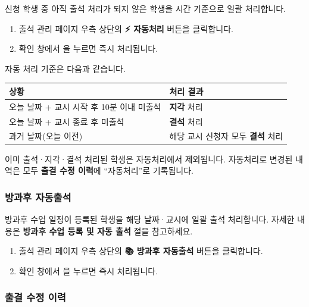 \documentclass[a4paper,12pt]{article}
\newcommand{\menu}[1]{\textcolor{primary}{\textbf{#1}}}
\newcommand{\key}[1]{\fbox{\small\texttt{#1}}}
\begin{document}
신청 학생 중 아직 출석 처리가 되지 않은 학생을 시간 기준으로 일괄 처리합니다.

\begin{enumerate}[leftmargin=1.5em]
    \item 출석 관리 페이지 우측 상단의 \menu{⚡ 자동처리} 버튼을 클릭합니다.
    \item 확인 창에서 \key{확인}을 누르면 즉시 처리됩니다.
\end{enumerate}

자동 처리 기준은 다음과 같습니다.

\begin{center}
\begin{tabular}{ll}
\toprule
\textbf{상황} & \textbf{처리 결과} \\
\midrule
오늘 날짜 + 교시 시작 후 10분 이내 미출석 & \textbf{지각} 처리 \\
오늘 날짜 + 교시 종료 후 미출석 & \textbf{결석} 처리 \\
과거 날짜(오늘 이전) & 해당 교시 신청자 모두 \textbf{결석} 처리 \\
\bottomrule
\end{tabular}
\end{center}

\begin{notebox}
  이미 출석·지각·결석 처리된 학생은 자동처리에서 제외됩니다.
  자동처리로 변경된 내역은 모두 \textbf{출결 수정 이력}에 ``자동처리''로 기록됩니다.
\end{notebox}

\subsubsection{방과후 자동출석}

방과후 수업 일정이 등록된 학생을 해당 날짜·교시에 일괄 출석 처리합니다.
자세한 내용은 \textbf{방과후 수업 등록 및 자동 출석} 절을 참고하세요.

\begin{enumerate}[leftmargin=1.5em]
    \item 출석 관리 페이지 우측 상단의 \menu{📚 방과후 자동출석} 버튼을 클릭합니다.
    \item 확인 창에서 \key{확인}을 누르면 즉시 처리됩니다.
\end{enumerate}

\subsubsection{출결 수정 이력}
\end{document}
